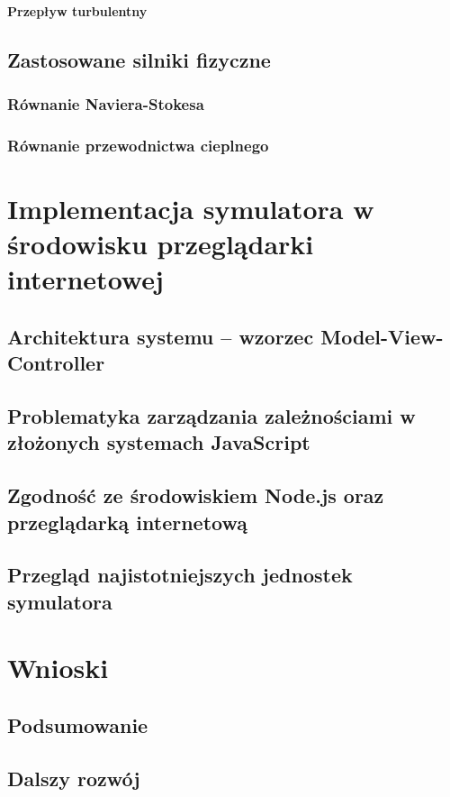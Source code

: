 \documentclass[pdflatex,12pt]{aghdpl}
\begin{document}
			\subsubsection{Przepływ turbulentny}
	\section{Zastosowane silniki fizyczne}
	\label{sec:silnikiFizyczne}
		\subsection{Równanie Naviera-Stokesa}
		\subsection{Równanie przewodnictwa cieplnego}

\chapter{Implementacja symulatora w środowisku przeglądarki internetowej}
	\section{Architektura systemu -- wzorzec Model-View-Controller}
	\section{Problematyka zarządzania zależnościami w złożonych systemach JavaScript}
	\section{Zgodność ze środowiskiem Node.js oraz przeglądarką internetową}
	\section{Przegląd najistotniejszych jednostek symulatora}




	
\chapter{Wnioski}
	\section{Podsumowanie}
	\section{Dalszy rozwój}

%
%


% 
% 



\end{document}
